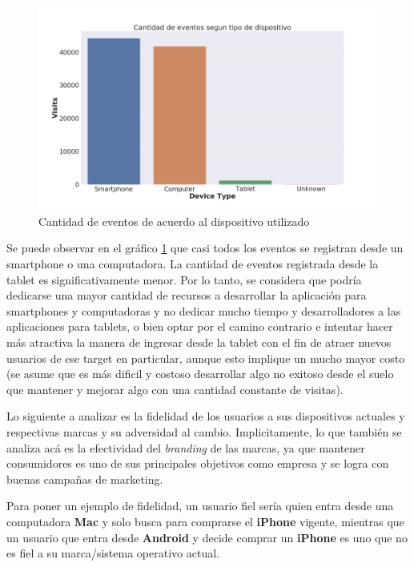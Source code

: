 \documentclass[a4paper]{article}
\begin{document}
\begin{figure}[h!]
	\includegraphics[width=\linewidth]{figures/150-eventos_tipo-barplot.png}
	\caption{Cantidad de eventos de acuerdo al dispositivo utilizado}
	\label{fig:dispositivos}
\end{figure}

Se puede observar en el gráfico \ref{fig:dispositivos} que casi todos los eventos se registran desde un smartphone o una computadora. La cantidad de eventos registrada desde la tablet es significativamente menor. Por lo tanto, se considera que podría dedicarse una mayor cantidad de recursos a desarrollar la aplicación para smartphones y computadoras y no dedicar mucho tiempo y desarrolladores a las aplicaciones para tablets, o bien optar por el camino contrario e intentar hacer más atractiva la manera de ingresar desde la tablet con el fin de atraer nuevos usuarios de ese target en particular, aunque esto implique un mucho mayor costo (se asume que es más dificil y costoso desarrollar algo no exitoso desde el suelo que mantener y mejorar algo con una cantidad constante de visitas).

Lo siguiente a analizar es la fidelidad de los usuarios a sus dispositivos actuales y respectivas marcas y su adversidad al cambio. Implicitamente, lo que también se analiza acá es la efectividad del \textit{branding} de las marcas, ya que mantener consumidores es uno de sus principales objetivos como empresa y se logra con buenas campañas de marketing.

Para poner un ejemplo de fidelidad, un usuario fiel sería quien entra desde una computadora \textbf{Mac} y solo busca para comprarse el \textbf{iPhone} vigente, mientras que un usuario que entra desde \textbf{Android} y decide comprar un \textbf{iPhone} es uno que no es fiel a su marca/sistema operativo actual.
\end{document}
